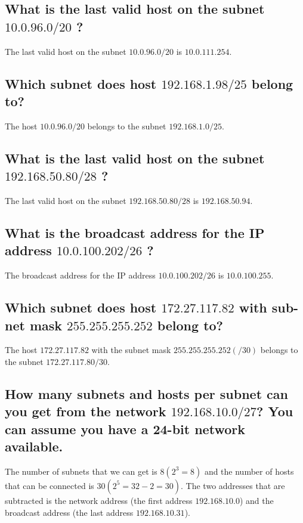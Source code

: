 \documentclass{article}
\begin{document}
\subsection{What is the last valid host on the subnet $10.0.96.0/20$ ?}

The last valid host on the subnet $10.0.96.0/20$ is $10.0.111.254$.

\subsection{Which subnet does host $192.168.1.98/25$ belong to?}

The host $10.0.96.0/20$ belongs to the subnet $192.168.1.0/25$.

\subsection{What is the last valid host on the subnet $192.168.50.80/28$ ?}

The last valid host on the subnet $192.168.50.80/28$ is $192.168.50.94$. 

\subsection{What is the broadcast address for the IP address $10.0.100.202/26$ ?} 

The broadcast address for the IP address $10.0.100.202/26$ is $10.0.100.255$.

\subsection{Which subnet does host $172.27.117.82$ with sub-net mask $255.255.255.252$ belong to?}

The host $172.27.117.82$ with the subnet mask $255.255.255.252 (/30) $ belongs to the subnet
$172.27.117.80/30$.

\subsection{How many subnets and hosts per subnet can you get from the network $192.168.10.0/27$? You can assume you have a 24-bit network available.}

The number of subnets that we can get is $ 8 (2^3 = 8) $ and the number of hosts that can be connected is $ 30 ( 2^5 = 32-2 = 30) $. The two addresses that are subtracted is the network address (the first address $192.168.10.0 $) and the broadcast address (the last address $ 192.168.10.31$). 
\end{document}
